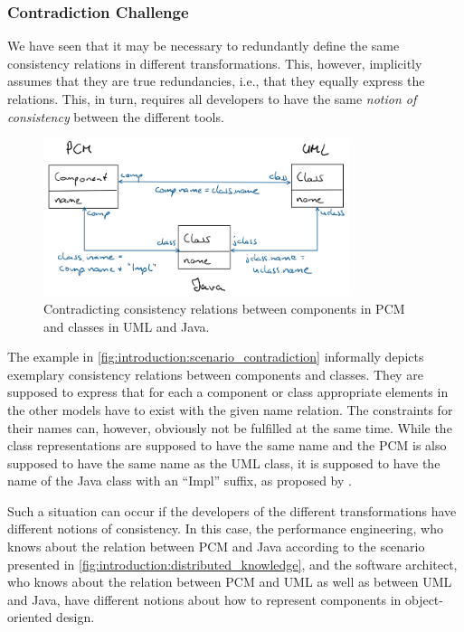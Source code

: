 \subsubsection*{Contradiction Challenge}

We have seen that it may be necessary to redundantly define the same consistency relations in different transformations.
This, however, implicitly assumes that they are true redundancies, i.e., that they equally express the relations.
This, in turn, requires all developers to have the same \emph{notion of consistency} between the different tools.

\begin{figure}
    \centering
    \includegraphics[width=0.8\textwidth]{figures/prologue/introduction/scenario_contradiction.png}
    \caption[Example for transformation contradictions]{Contradicting consistency relations between components in \gls{PCM} and classes in \gls{UML} and Java.}
    \label{fig:introduction:scenario_contradiction}
\end{figure}

The example in \autoref{fig:introduction:scenario_contradiction} informally depicts exemplary consistency relations between components and classes.
They are supposed to express that for each a component or class appropriate elements in the other models have to exist with the given name relation.
The constraints for their names can, however, obviously not be fulfilled at the same time.
While the class representations are supposed to have the same name and the \gls{PCM} is also supposed to have the same name as the \gls{UML} class, it is supposed to have the name of the Java class with an \enquote{Impl} suffix, as proposed by \textcite{langhammer2017a}.

Such a situation can occur if the developers of the different transformations have different notions of consistency.
In this case, the performance engineering, who knows about the relation between \gls{PCM} and Java according to the scenario presented in \autoref{fig:introduction:distributed_knowledge}, and the software architect, who knows about the relation between \gls{PCM} and \gls{UML} as well as between \gls{UML} and Java, have different notions about how to represent components in object-oriented design.

